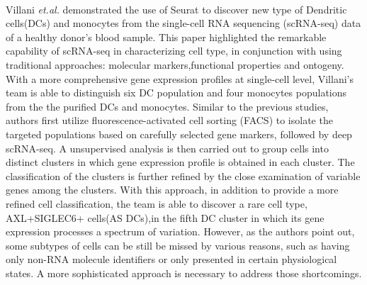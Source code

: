 \documentclass{article}
\begin{document}
%
%
  
\medskip

\paragraph{}
Villani \textit{et.al.} demonstrated the use of Seurat to discover new type of Dendritic cells(DCs) and monocytes from the single-cell RNA sequencing (scRNA-seq) data of a healthy donor's blood sample. This paper highlighted the remarkable capability of scRNA-seq in characterizing cell type, in conjunction with using traditional approaches: molecular markers,functional properties and ontogeny. With a more comprehensive gene expression profiles at single-cell level, Villani's team is able to distinguish six DC population and four monocytes populations from the the purified DCs and monocytes. Similar to the previous studies, authors first utilize fluorescence-activated cell sorting (FACS) to isolate the targeted populations based on carefully selected gene markers, followed by deep scRNA-seq. A unsupervised analysis is then carried out to group cells into distinct clusters in which gene expression profile is obtained in each cluster. The classification of the clusters is further refined by the close examination of variable genes among the clusters. With this approach, in addition to provide a more refined cell classification, the team is able to discover a rare cell type, AXL+SIGLEC6+ cells(AS DCs),in the fifth DC cluster in which its gene expression processes a spectrum of variation. However, as the authors point out, some subtypes of cells can be still be missed by various reasons, such as having only non-RNA molecule identifiers or only presented in certain physiological states. A more sophisticated approach is necessary to address those shortcomings.
\end{document}
